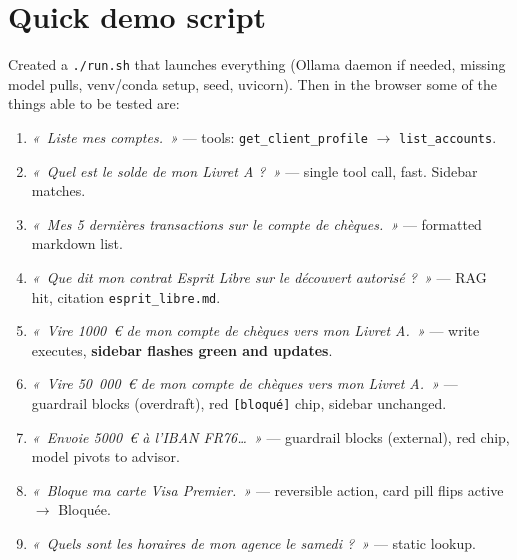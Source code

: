 \documentclass[11pt]{article}
\begin{document}
\section{Quick demo script}

Created a \texttt{./run.sh} that launches everything (Ollama daemon if needed, missing model pulls, venv/conda setup, seed, uvicorn). Then in the browser some of the things able to be tested are:

\begin{enumerate}[leftmargin=*]
  \item \textit{«~Liste mes comptes.~»} --- tools: \texttt{get\_client\_profile} $\rightarrow$ \texttt{list\_accounts}.
  \item \textit{«~Quel est le solde de mon Livret A ?~»} --- single tool call, fast. Sidebar matches.
  \item \textit{«~Mes 5 dernières transactions sur le compte de chèques.~»} --- formatted markdown list.
  \item \textit{«~Que dit mon contrat Esprit Libre sur le découvert autorisé ?~»} --- RAG hit, citation \texttt{esprit\_libre.md}.
  \item \textit{«~Vire 1000~\euro{} de mon compte de chèques vers mon Livret A.~»} --- write executes, \textbf{sidebar flashes green and updates}.
  \item \textit{«~Vire 50~000~\euro{} de mon compte de chèques vers mon Livret A.~»} --- guardrail blocks (overdraft), red \texttt{[bloqué]} chip, sidebar unchanged.
  \item \textit{«~Envoie 5000~\euro{} à l'IBAN FR76\ldots~»} --- guardrail blocks (external), red chip, model pivots to advisor.
  \item \textit{«~Bloque ma carte Visa Premier.~»} --- reversible action, card pill flips active $\rightarrow$ Bloquée.
  \item \textit{«~Quels sont les horaires de mon agence le samedi ?~»} --- static lookup.
\end{enumerate}
\end{document}
